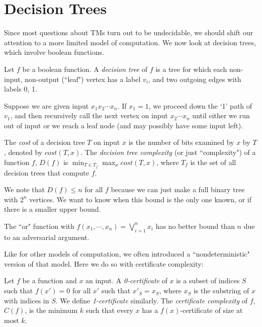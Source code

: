\section{Decision Trees}

Since most questions about TMs turn out to be undecidable, we should shift our attention to a more limited model of computation. We now look at decision trees, which involve boolean functions. 

\begin{definition}
Let $f$ be a boolean function. A \emph{decision tree} of $f$ is a tree for which each non-input, non-output (``leaf") vertex has a label $v_i$, and two outgoing edges with labels 0, 1.
\end{definition}

Suppose we are given input $x_1x_2\cdots x_n$. If $x_1 = 1$, we proceed down the `1' path of $v_1$, and then recursively call the next vertex on input $x_2\cdots x_n$ until either we run out of input or we reach a leaf node (and may possibly have some input left). 

\begin{definition}
The \emph{cost} of a decision tree $T$ on input $x$ is the number of bits examined by $x$ by $T$, denoted by $cost(T, x)$. The \emph{decision tree complexity} (or just ``complexity") of a function $f$, $D(f)$ is $\min_{T \in T_f} \max_{x} cost(T, x)$, where $T_f$ is the set of all decision trees that compute $f$. 
\end{definition}

We note that $D(f) \le n$ for all $f$ because we can just make a full binary tree with $2^n$ vertices. We want to know when this bound is the only one known, or if there is a smaller upper bound.

\begin{example}
The ``or" function with $f(x_1, \cdots, x_n) = \bigvee_{i=1}^{n}x_i$ has no better bound than $n$ due to an adversarial argument. 
\end{example}

Like for other models of computation, we often introduced a ``nondeterministic" version of that model. Here we do so with certificate complexity:
\begin{definition}
Let $f$ be a function and $x$ an input. A \emph{0-certificate} of $x$ is a subset of indices $S$ such that $f(x') = 0$ for all $x'$ such that $x'_{S} = x_{S}$, where $x_{S}$ is the substring of $x$ with indices in $S$. We define \emph{1-certificate} similarly. The \emph{certificate complexity} of $f$, $C(f)$, is the minimum $k$ such that every $x$ has a $f(x)$-certificate of size at most $k$. 
\end{definition}


